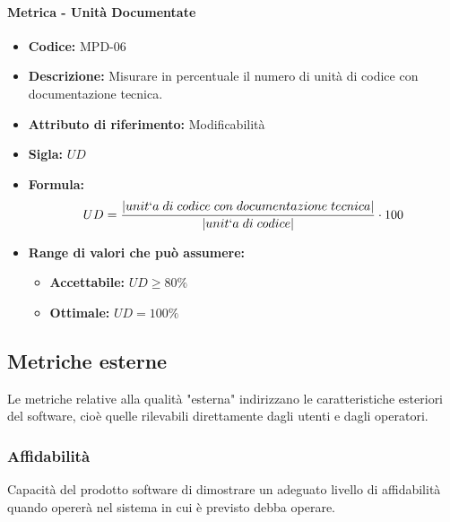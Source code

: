 \paragraph{Metrica - Unità Documentate} 
   \begin{itemize}
          \item  \textbf{Codice:} MPD-06
         \item   \textbf{Descrizione:} Misurare in percentuale il numero di unità di codice con documentazione tecnica.
         \item   \textbf{Attributo di riferimento:} Modificabilità
         \item   \textbf{Sigla:} $UD$
         \item   \textbf{Formula:} $$UD = {|unit`a \; di \; codice \; con \; documentazione \; tecnica| \over |unit`a \; di \; codice|} \cdot 100$$
   

        \item \textbf{Range di valori che può assumere:}
        \begin{itemize}
            \item \textbf{Accettabile:} $UD \geq 80\%  $
            \item \textbf{Ottimale:} $UD = 100\%$
        \end{itemize}
       \end{itemize}
              
       
\subsection{Metriche esterne}
Le metriche relative alla qualità "esterna" indirizzano le caratteristiche esteriori del software, cioè quelle rilevabili direttamente dagli utenti e dagli operatori.

\subsubsection{Affidabilità}
Capacità del prodotto software di dimostrare un adeguato livello di affidabilità quando opererà nel sistema in cui è previsto debba operare.
    
